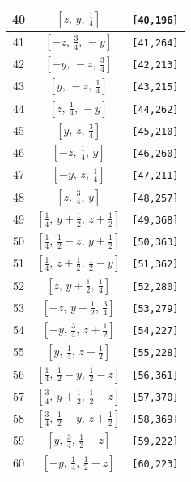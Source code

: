 \documentclass[fleqn,8pt]{jsarticle}
\begin{document}
\begin{longtable}{ccc}
40 & $\left[ z,\, y,\, \frac{1}{4} \right]$ & {\tt [40,196]} \\ \hline
41 & $\left[ - z,\, \frac{3}{4},\, - y \right]$ & {\tt [41,264]} \\ \hline
42 & $\left[ - y,\, - z,\, \frac{3}{4} \right]$ & {\tt [42,213]} \\ \hline
43 & $\left[ y,\, - z,\, \frac{1}{4} \right]$ & {\tt [43,215]} \\ \hline
44 & $\left[ z,\, \frac{1}{4},\, - y \right]$ & {\tt [44,262]} \\ \hline
45 & $\left[ y,\, z,\, \frac{3}{4} \right]$ & {\tt [45,210]} \\ \hline
46 & $\left[ - z,\, \frac{1}{4},\, y \right]$ & {\tt [46,260]} \\ \hline
47 & $\left[ - y,\, z,\, \frac{1}{4} \right]$ & {\tt [47,211]} \\ \hline
48 & $\left[ z,\, \frac{3}{4},\, y \right]$ & {\tt [48,257]} \\ \hline
49 & $\left[ \frac{1}{4},\, y + \frac{1}{2},\, z + \frac{1}{2} \right]$ & {\tt [49,368]} \\ \hline
50 & $\left[ \frac{1}{4},\, \frac{1}{2} - z,\, y + \frac{1}{2} \right]$ & {\tt [50,363]} \\ \hline
51 & $\left[ \frac{1}{4},\, z + \frac{1}{2},\, \frac{1}{2} - y \right]$ & {\tt [51,362]} \\ \hline
52 & $\left[ z,\, y + \frac{1}{2},\, \frac{1}{4} \right]$ & {\tt [52,280]} \\ \hline
53 & $\left[ - z,\, y + \frac{1}{2},\, \frac{3}{4} \right]$ & {\tt [53,279]} \\ \hline
54 & $\left[ - y,\, \frac{3}{4},\, z + \frac{1}{2} \right]$ & {\tt [54,227]} \\ \hline
55 & $\left[ y,\, \frac{1}{4},\, z + \frac{1}{2} \right]$ & {\tt [55,228]} \\ \hline
56 & $\left[ \frac{1}{4},\, \frac{1}{2} - y,\, \frac{1}{2} - z \right]$ & {\tt [56,361]} \\ \hline
57 & $\left[ \frac{3}{4},\, y + \frac{1}{2},\, \frac{1}{2} - z \right]$ & {\tt [57,370]} \\ \hline
58 & $\left[ \frac{3}{4},\, \frac{1}{2} - y,\, z + \frac{1}{2} \right]$ & {\tt [58,369]} \\ \hline
59 & $\left[ y,\, \frac{3}{4},\, \frac{1}{2} - z \right]$ & {\tt [59,222]} \\ \hline
60 & $\left[ - y,\, \frac{1}{4},\, \frac{1}{2} - z \right]$ & {\tt [60,223]} \\ \hline

\end{longtable}
\end{document}
